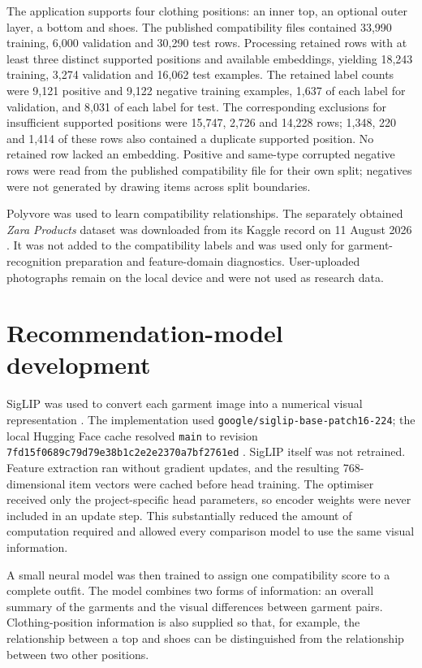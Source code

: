 The application supports four clothing positions: an inner top, an optional
outer layer, a bottom and shoes. The published compatibility files contained
33,990 training, 6,000 validation and 30,290 test rows. Processing retained
rows with at least three distinct supported positions and available
embeddings, yielding 18,243 training, 3,274 validation and 16,062 test
examples. The retained label counts were 9,121 positive and 9,122 negative
training examples, 1,637 of each label for validation, and 8,031 of each label
for test. The corresponding exclusions for insufficient supported positions
were 15,747, 2,726 and 14,228 rows; 1,348, 220 and 1,414 of these rows also
contained a duplicate supported position. No retained row lacked an embedding.
Positive and same-type corrupted negative rows were read from the published
compatibility file for their own split; negatives were not generated by
drawing items across split boundaries.

Polyvore was used to learn compatibility relationships. The separately
obtained \emph{Zara Products} dataset was downloaded from its Kaggle record on
11 August 2026 \parencite{parrenolara2024zara}. It was not added to the
compatibility labels and was used only for garment-recognition preparation and
feature-domain diagnostics.
User-uploaded photographs remain on the local device and were not used as
research data.

\section{Recommendation-model development}

SigLIP was used to convert each garment image into a numerical visual
representation \parencite{zhai2023siglip}. The implementation used
\texttt{google/siglip-base-patch16-224}; the local Hugging Face cache resolved
\texttt{main} to revision
\texttt{7fd15f0689c79d79e38b}\allowbreak\texttt{1c2e2e2370a7bf2761ed}
\parencite{google2024siglipmodelcard}. SigLIP itself was not retrained. Feature
extraction ran without gradient updates, and the resulting 768-dimensional
item vectors were cached before head training. The optimiser received only the
project-specific head parameters, so encoder weights were never included in
an update step. This substantially reduced the
amount of computation required and allowed every comparison model to use the
same visual information.

A small neural model was then trained to assign one compatibility score to a
complete outfit. The model combines two forms of information: an overall
summary of the garments and the visual differences between garment pairs.
Clothing-position information is also supplied so that, for example, the
relationship between a top and shoes can be distinguished from the relationship
between two other positions.

